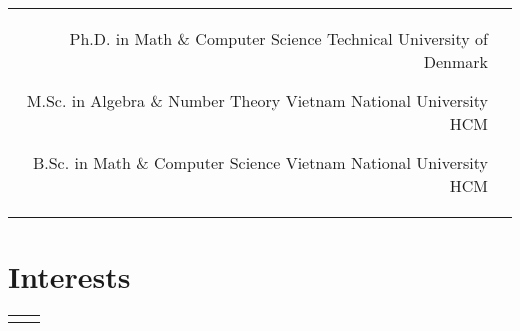 \documentclass[11pt]{article} %
\begin{document}
\begin{paracol}{2}


\begin{supertabular}{rl} %

	
	{Ph.D. in Math \& Computer Science} %
	{} %
    {} %
	{Technical University of Denmark} %
	
	
	{M.Sc. in Algebra \& Number Theory} %
	{} %
    {} %
	{Vietnam National University HCM} %
	
	
	{B.Sc. in Math \& Computer Science} %
	{} %
    {} %
	{Vietnam National University HCM} %
	

\end{supertabular}


\section{Interests}

\begin{supertabular}{rl} %
	


\end{supertabular}
\end{paracol}
\end{document}
